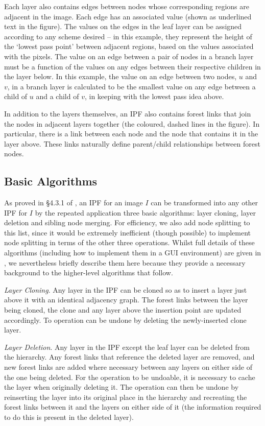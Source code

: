 \documentclass[a4paper]{article}
\begin{document}
Each layer also contains edges between nodes whose corresponding regions are adjacent in the image. Each edge has an associated value (shown as underlined text in the figure). The values on the edges in the leaf layer can be assigned according to any scheme desired -- in this example, they represent the height of the `lowest pass point' between adjacent regions, based on the values associated with the pixels. The value on an edge between a pair of nodes in a branch layer must be a function of the values on any edges between their respective children in the layer below. In this example, the value on an edge between two nodes, $u$ and $v$, in a branch layer is calculated to be the smallest value on any edge between a child of $u$ and a child of $v$, in keeping with the lowest pass idea above.

In addition to the layers themselves, an IPF also contains forest links that join the nodes in adjacent layers together (the coloured, dashed lines in the figure). In particular, there is a link between each node and the node that contains it in the layer above. These links naturally define parent/child relationships between forest nodes.

\subsection{Basic Algorithms}

As proved in \S4.3.1 of \cite{golodetz11}, an IPF for an image $I$ can be transformed into any other IPF for $I$ by the repeated application three basic algorithms: layer cloning, layer deletion and sibling node merging. For efficiency, we also add node splitting to this list, since it would be extremely inefficient (though possible) to implement node splitting in terms of the other three operations. Whilst full details of these algorithms (including how to implement them in a GUI environment) are given in \cite{golodetz11}, we nevertheless briefly describe them here because they provide a necessary background to the higher-level algorithms that follow.

\emph{Layer Cloning}. Any layer in the IPF can be cloned so as to insert a layer just above it with an identical adjacency graph. The forest links between the layer being cloned, the clone and any layer above the insertion point are updated accordingly. To operation can be undone by deleting the newly-inserted clone layer.

\emph{Layer Deletion}. Any layer in the IPF except the leaf layer can be deleted from the hierarchy. Any forest links that reference the deleted layer are removed, and new forest links are added where necessary between any layers on either side of the one being deleted. For the operation to be undoable, it is necessary to cache the layer when originally deleting it. The operation can then be undone by reinserting the layer into its original place in the hierarchy and recreating the forest links between it and the layers on either side of it (the information required to do this is present in the deleted layer).
\end{document}
